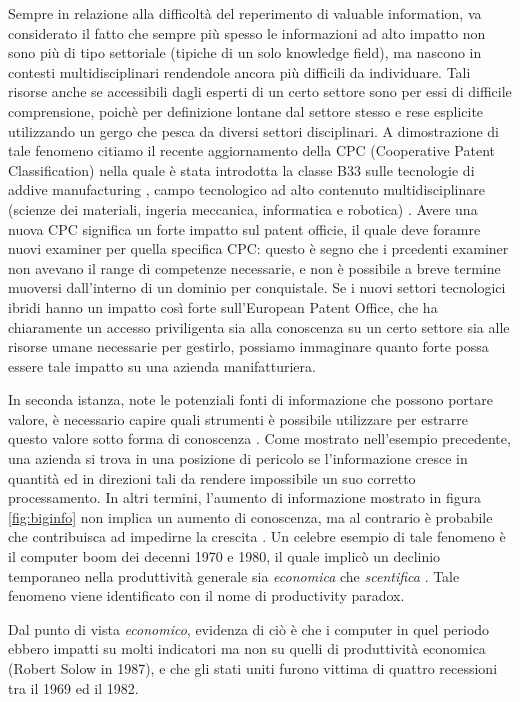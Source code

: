 \documentclass[]{book}
\begin{document}
Sempre in relazione alla difficoltà del reperimento di valuable
information, va considerato il fatto che sempre più spesso le
informazioni ad alto impatto non sono più di tipo settoriale (tipiche di
un solo knowledge field), ma nascono in contesti multidisciplinari
rendendole ancora più difficili da individuare. Tali risorse anche se
accessibili dagli esperti di un certo settore sono per essi di difficile
comprensione, poichè per definizione lontane dal settore stesso e rese
esplicite utilizzando un gergo che pesca da diversi settori
disciplinari. A dimostrazione di tale fenomeno citiamo il recente
aggiornamento della CPC (Cooperative Patent Classification) nella quale
è stata introdotta la classe B33 sulle tecnologie di addive
manufacturing \citep{cpc2014}, campo tecnologico ad alto contenuto
multidisciplinare (scienze dei materiali, ingeria meccanica, informatica
e robotica) \citep{mueller2012additive}. Avere una nuova CPC significa
un forte impatto sul patent officie, il quale deve foramre nuovi
examiner per quella specifica CPC: questo è segno che i prcedenti
examiner non avevano il range di competenze necessarie, e non è
possibile a breve termine muoversi dall'interno di un dominio per
conquistale. Se i nuovi settori tecnologici ibridi hanno un impatto così
forte sull'European Patent Office, che ha chiaramente un accesso
priviligenta sia alla conoscenza su un certo settore sia alle risorse
umane necessarie per gestirlo, possiamo immaginare quanto forte possa
essere tale impatto su una azienda manifatturiera.

In seconda istanza, note le potenziali fonti di informazione che possono
portare valore, è necessario capire quali strumenti è possibile
utilizzare per estrarre questo valore sotto forma di conoscenza
\citep{hand2007principles, mining2006data}. Come mostrato nell'esempio
precedente, una azienda si trova in una posizione di pericolo se
l'informazione cresce in quantità ed in direzioni tali da rendere
impossibile un suo corretto processamento. In altri termini, l'aumento
di informazione mostrato in figura \ref{fig:biginfo} non implica un
aumento di conoscenza, ma al contrario è probabile che contribuisca ad
impedirne la crescita \citep{allen2003information, herbig1994effect}. Un
celebre esempio di tale fenomeno è il computer boom dei decenni 1970 e
1980, il quale implicò un declinio temporaneo nella produttività
generale sia \emph{economica} che \emph{scentifica} \citep{solow1987we}.
Tale fenomeno viene identificato con il nome di productivity paradox.

Dal punto di vista \emph{economico}, evidenza di ciò è che i computer in
quel periodo ebbero impatti su molti indicatori ma non su quelli di
produttività economica (Robert Solow in 1987), e che gli stati uniti
furono vittima di quattro recessioni tra il 1969 ed il
1982\citep{national2010us}.
\end{document}
